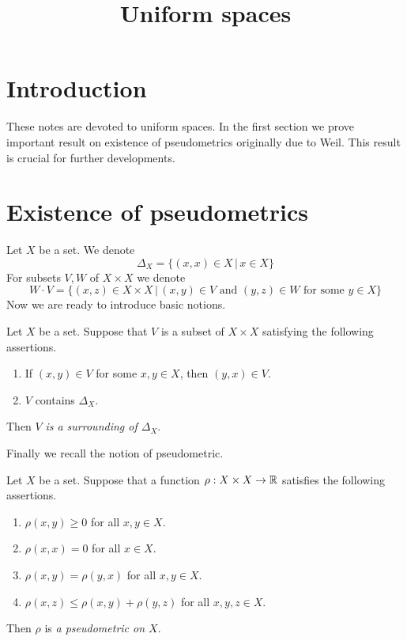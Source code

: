 



\title{Uniform spaces}
\date{}
\maketitle

\section{Introduction}
\noindent
These notes are devoted to uniform spaces. In the first section we prove important result on existence of pseudometrics originally due to Weil. This result is crucial for further developments.

\section{Existence of pseudometrics}
\noindent
Let $X$ be a set. We denote 
$$\Delta_X = \big\{(x,x)\in X\,\big|\,x\in X\big\}$$
For subsets $V,W$ of $X\times X$ we denote
$$W\cdot V = \big\{(x,z)\in X\times X\,\big|\,(x,y)\in V\mbox{ and }(y,z)\in W\mbox{ for some }y\in X\big\}$$
Now we are ready to introduce basic notions.

\begin{definition}
Let $X$ be a set. Suppose that $V$ is a subset of $X\times X$ satisfying the following assertions.
\begin{enumerate}[label=\textbf{(\arabic*)}, leftmargin=*]
\item If $(x,y)\in V$ for some $x,y\in X$, then $(y,x)\in V$.
\item $V$ contains $\Delta_X$.
\end{enumerate}
Then $V$ \textit{is a surrounding of $\Delta_X$}.
\end{definition}
\noindent
Finally we recall the notion of pseudometric.

\begin{definition}
Let $X$ be a set. Suppose that a function $\rho:X\times X\rightarrow {\mathbb R}$ satisfies the following assertions.
\begin{enumerate}[label=\textbf{(\arabic*)}, leftmargin=*]
\item $\rho(x,y) \geq 0$ for all $x,y\in X$.
\item $\rho(x,x) = 0$ for all $x\in X$.
\item $\rho(x,y) = \rho(y,x)$ for all $x,y\in X$.
\item $\rho(x,z)\leq \rho(x,y) + \rho(y,z)$ for all $x,y,z\in X$.
\end{enumerate}
Then $\rho$ is \textit{a pseudometric on $X$}.
\end{definition}

